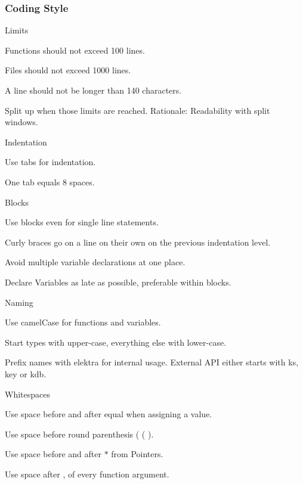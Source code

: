 \subsubsection*{Coding Style}


\begin{DoxyItemize}
\item Limits
\begin{DoxyItemize}
\item Functions should not exceed 100 lines.
\item Files should not exceed 1000 lines.
\item A line should not be longer than 140 characters.
\end{DoxyItemize}
\end{DoxyItemize}

Split up when those limits are reached. Rationale\+: Readability with split windows.


\begin{DoxyItemize}
\item Indentation
\begin{DoxyItemize}
\item Use tabs for indentation.
\item One tab equals 8 spaces.
\end{DoxyItemize}
\item Blocks
\begin{DoxyItemize}
\item Use blocks even for single line statements.
\item Curly braces go on a line on their own on the previous indentation level.
\item Avoid multiple variable declarations at one place.
\item Declare Variables as late as possible, preferable within blocks.
\end{DoxyItemize}
\item Naming
\begin{DoxyItemize}
\item Use camel\+Case for functions and variables.
\item Start types with upper-\/case, everything else with lower-\/case.
\item Prefix names with {\ttfamily elektra} for internal usage. External A\+P\+I either starts with {\ttfamily ks}, {\ttfamily key} or {\ttfamily kdb}.
\end{DoxyItemize}
\item Whitespaces
\begin{DoxyItemize}
\item Use space before and after equal when assigning a value.
\item Use space before round parenthesis ( {\ttfamily (} ).
\item Use space before and after {\ttfamily $\ast$} from Pointers.
\item Use space after {\ttfamily ,} of every function argument.
\end{DoxyItemize}
\end{DoxyItemize}

